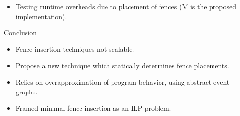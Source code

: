 \documentclass[notes, xcolor=dvipsnames]{beamer}
\begin{document}
    \begin{frame}

        \begin{itemize}
            \item Testing runtime overheads due to placement of fences (M is the proposed implementation).
        \end{itemize}

        \begin{figure}
        \end{figure}

    \end{frame}


    \begin{frame}{Conclusion}
        
        \begin{itemize}
            \item Fence insertion techniques not scalable.
            \item Propose a new technique which statically determines fence placements.
            \item Relies on overapproximation of program behavior, using abstract event graphs.
            \item Framed minimal fence insertion as an ILP problem.
        \end{itemize}

    \end{frame}
\end{document}
